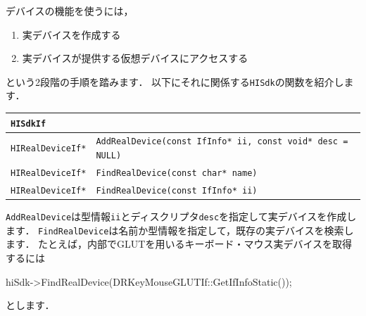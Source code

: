 \KLUDGE デバイスの機能を使うには，
\begin{enumerate}
\item \KLUDGE 実デバイスを作成する
\item \KLUDGE 実デバイスが提供する仮想デバイスにアクセスする
\end{enumerate}
\KLUDGE という2\KLUDGE 段階の手順を踏みます．
\KLUDGE 以下にそれに関係する\texttt{HISdk}\KLUDGE の関数を紹介します．
\begin{center}
\begin{tabular}{p{.25\hsize}p{.65\hsize}}
\texttt{HISdkIf}																		\\ \midrule
\texttt{HIRealDeviceIf*}	& \texttt{AddRealDevice(const IfInfo* ii, const void* desc = NULL)} \\
\texttt{HIRealDeviceIf*}	& \texttt{FindRealDevice(const char* name)} \\
\texttt{HIRealDeviceIf*}	& \texttt{FindRealDevice(const IfInfo* ii)}
\end{tabular}
\end{center}
\texttt{AddRealDevice}\KLUDGE は型情報\texttt{ii}\KLUDGE とディスクリプタ\texttt{desc}\KLUDGE を指定して実デバイスを作成します．
\texttt{FindRealDevice}\KLUDGE は名前か型情報を指定して，既存の実デバイスを検索します．
\KLUDGE たとえば，内部でGLUT\KLUDGE を用いるキーボード・マウス実デバイスを取得するには
\begin{sourcecode}
hiSdk->FindRealDevice(DRKeyMouseGLUTIf::GetIfInfoStatic());
\end{sourcecode}
\KLUDGE とします．

